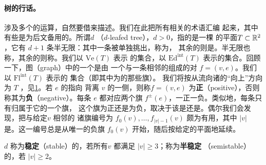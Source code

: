 \paragraph{树的行话。}\label{sub:tree-speak}
涉及多个\trPointedDisc{}的\trGluing{}运算，自然要借\trTree{}来描述。我们在此把所有相关的术语汇编
起来，其中有些是为后文备用的。所谓\textbf{$d$ \trLeafedTree}（$d$-leafed tree），$d>0$，指的是一棵%
\trProper\trEmbedding{}的平面\trTree{}$T\subset\mathbb{R}^2$，它有 $d+1$ 条半无限\trEdge：其中一条被单独挑出，称为\trRoot，
其余的则是\trLeaf。半无限\trEdge{}也称\trExteriorEdge，其余的则称\trInteriorEdge。我们以 $\mathrm{Ve}(T)$ 表示%
\trVertex{}的集合，以 $\mathrm{Ed}^{\mathrm{int}}(T)$ 表示\trInteriorEdge{}的集合。回顾一下，图（graph）中的一个\trFlag{}是由
一个\trVertex{}与一条相邻的\trEdge{}组成的对 $f=(v,e)$。我们以 $\mathrm{Fl}^{\mathrm{int}}(T)$ 表示\trInteriorFlag{}的
集合（即其中\trEdge{}为\trInteriorEdge{}的那些旗）。
我们将按从\trRoot{}流向诸\trLeaf{}的“向上”方向为 $T$ \trOrientation，见\cref{fig:leafed-tree}。若 $e$ 的\trOrientation{}指向
背离 $v$ 的一侧，则称\trFlag{}$f=(v,e)$ 为\textbf{正}（positive），否则称其为\textbf{负}（negative）。每条%
\trInteriorEdge{}$e$ 都对应两个旗 $f^{\pm}(e)$，一正一负。类似地，每条\trExteriorEdge{}只有归属于它的一个旗，
这个旗为正还是为负，取决于该\trEdge{}是\trLeaf{}还是\trRoot。偶尔我们会发现，把与给定\trVertex{}$v$ 相邻的
诸旗编号为 $f_0(v),\ldots,f_{|v|-1}(v)$ 颇为有用，其中 $|v|$ 是\trValency。这一编号总是从唯一的负旗 $f_0(v)$
开始，随后按给定的平面\trEmbedding{}\trAnticlockwise{}地延续。
\begin{figure}[htbp]
\centering
{}
\caption{}\label{fig:leafed-tree}
\end{figure}
\emph{$d$ \trLeafedTree}称为\textbf{稳定}（stable）的，若所有\trVertex{}$v$ 都满足 $|v|\ge 3$；称为\textbf{半稳定}
（semistable）的，若 $|v|\ge 2$。
